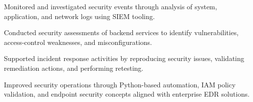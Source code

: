 

\vspace{1mm}

\begin{cvitems}
  \item {Monitored and investigated security events through analysis of system, application, and network logs using SIEM tooling.}
  \item {Conducted security assessments of backend services to identify vulnerabilities, access-control weaknesses, and misconfigurations.}
  \item {Supported incident response activities by reproducing security issues, validating remediation actions, and performing retesting.}
  \item {Improved security operations through Python-based automation, IAM policy validation, and endpoint security concepts aligned with enterprise EDR solutions.}
\end{cvitems}

\vspace{4mm}
